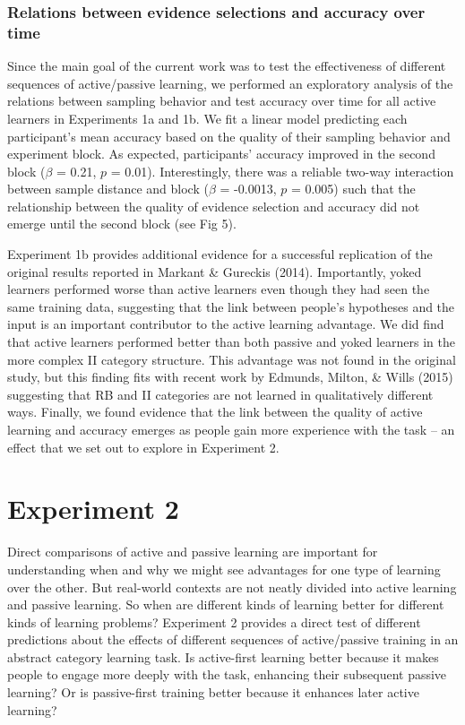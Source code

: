 \documentclass[10pt, letterpaper]{article}
\begin{document}
\subsubsection{Relations between evidence selections and accuracy over
time}\label{relations-between-evidence-selections-and-accuracy-over-time}

Since the main goal of the current work was to test the effectiveness of
different sequences of active/passive learning, we performed an
exploratory analysis of the relations between sampling behavior and test
accuracy over time for all active learners in Experiments 1a and 1b. We
fit a linear model predicting each participant's mean accuracy based on
the quality of their sampling behavior and experiment block. As
expected, participants' accuracy improved in the second block (\(\beta\)
= 0.21, \(p\) = 0.01). Interestingly, there was a reliable two-way
interaction between sample distance and block (\(\beta\) = -0.0013,
\(p\) = 0.005) such that the relationship between the quality of
evidence selection and accuracy did not emerge until the second block
(see Fig 5).

Experiment 1b provides additional evidence for a successful replication
of the original results reported in Markant \& Gureckis (2014).
Importantly, yoked learners performed worse than active learners even
though they had seen the same training data, suggesting that the link
between people's hypotheses and the input is an important contributor to
the active learning advantage. We did find that active learners
performed better than both passive and yoked learners in the more
complex II category structure. This advantage was not found in the
original study, but this finding fits with recent work by Edmunds,
Milton, \& Wills (2015) suggesting that RB and II categories are not
learned in qualitatively different ways. Finally, we found evidence that
the link between the quality of active learning and accuracy emerges as
people gain more experience with the task -- an effect that we set out
to explore in Experiment 2.

\section{Experiment 2}\label{experiment-2}

Direct comparisons of active and passive learning are important for
understanding when and why we might see advantages for one type of
learning over the other. But real-world contexts are not neatly divided
into active learning and passive learning. So when are different kinds
of learning better for different kinds of learning problems? Experiment
2 provides a direct test of different predictions about the effects of
different sequences of active/passive training in an abstract category
learning task. Is active-first learning better because it makes people
to engage more deeply with the task, enhancing their subsequent passive
learning? Or is passive-first training better because it enhances later
active learning?
\end{document}

